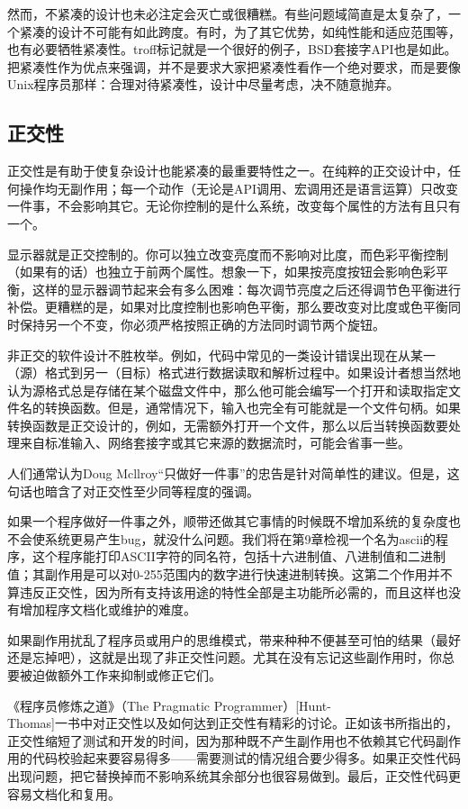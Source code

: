 \documentclass[11pt,oneside]{book}
\begin{document}
\begin{common-format}
然而，不紧凑的设计也未必注定会灭亡或很糟糕。有些问题域简直是太复杂了，一个紧凑的设计不可能有如此跨度。有时，为了其它优势，如纯性能和适应范围等，也有必要牺牲紧凑性。troff标记就是一个很好的例子，BSD套接字API也是如此。把紧凑性作为优点来强调，并不是要求大家把紧凑性看作一个绝对要求，而是要像Unix程序员那样：合理对待紧凑性，设计中尽量考虑，决不随意抛弃。

\subsection{正交性}
正交性是有助于使复杂设计也能紧凑的最重要特性之一。在纯粹的正交设计中，任何操作均无副作用；每一个动作（无论是API调用、宏调用还是语言运算）只改变一件事，不会影响其它。无论你控制的是什么系统，改变每个属性的方法有且只有一个。

显示器就是正交控制的。你可以独立改变亮度而不影响对比度，而色彩平衡控制（如果有的话）也独立于前两个属性。想象一下，如果按亮度按钮会影响色彩平衡，这样的显示器调节起来会有多么困难：每次调节亮度之后还得调节色平衡进行补偿。更糟糕的是，如果对比度控制也影响色平衡，那么要改变对比度或色平衡同时保持另一个不变，你必须严格按照正确的方法同时调节两个旋钮。

非正交的软件设计不胜枚举。例如，代码中常见的一类设计错误出现在从某一（源）格式到另一（目标）格式进行数据读取和解析过程中。如果设计者想当然地认为源格式总是存储在某个磁盘文件中，那么他可能会编写一个打开和读取指定文件名的转换函数。但是，通常情况下，输入也完全有可能就是一个文件句柄。如果转换函数是正交设计的，例如，无需额外打开一个文件，那么以后当转换函数要处理来自标准输入、网络套接字或其它来源的数据流时，可能会省事一些。

人们通常认为Doug Mcllroy“只做好一件事”的忠告是针对简单性的建议。但是，这句话也暗含了对正交性至少同等程度的强调。

如果一个程序做好一件事之外，顺带还做其它事情的时候既不增加系统的复杂度也不会使系统更易产生bug，就没什么问题。我们将在第9章检视一个名为ascii的程序，这个程序能打印ASCII字符的同名符，包括十六进制值、八进制值和二进制值；其副作用是可以对0-255范围内的数字进行快速进制转换。这第二个作用并不算违反正交性，因为所有支持该用途的特性全部是主功能所必需的，而且这样也没有增加程序文档化或维护的难度。

如果副作用扰乱了程序员或用户的思维模式，带来种种不便甚至可怕的结果（最好还是忘掉吧），这就是出现了非正交性问题。尤其在没有忘记这些副作用时，你总要被迫做额外工作来抑制或修正它们。

《程序员修炼之道》（The Pragmatic Programmer）[Hunt-\\Thomas]一书中对正交性以及如何达到正交性有精彩的讨论。正如该书所指出的，正交性缩短了测试和开发的时间，因为那种既不产生副作用也不依赖其它代码副作用的代码校验起来要容易得多——需要测试的情况组合要少得多。如果正交性代码出现问题，把它替换掉而不影响系统其余部分也很容易做到。最后，正交性代码更容易文档化和复用。


\end{common-format}
\end{document}
